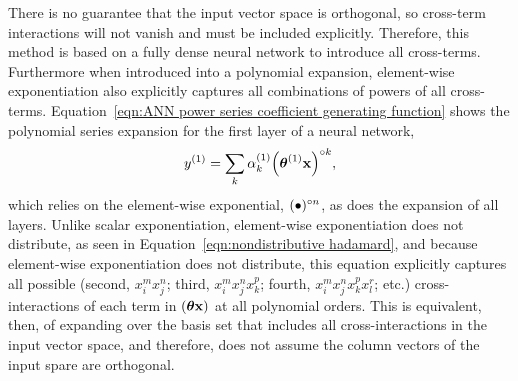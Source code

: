 %
%

There is no guarantee that the input vector space is orthogonal, so cross-term interactions will not vanish and must be included explicitly. Therefore, this method is based on a fully dense neural network to introduce all cross-terms. Furthermore when introduced into a polynomial expansion, element-wise exponentiation also explicitly captures all combinations of powers of all cross-terms. Equation~\ref{eqn:ANN power series coefficient generating function} shows the polynomial series expansion for the first layer of a neural network,
\[
    y^{(1)} = \sum_k \alpha^{(1)}_k \he[\left( \boldsymbol{\theta}^{(1)} {\bf x} \right)]{k},
\]
which relies on the element-wise exponential, $(\bullet)\he{n}$, as does the expansion of all layers. Unlike scalar exponentiation, element-wise exponentiation does not distribute, as seen in Equation~\ref{eqn:nondistributive hadamard}, and because element-wise exponentiation does not distribute, this equation explicitly captures all possible (second, $x_i^m x_j^n$; third, $x_i^m x_j^n x_k^p$; fourth, $x_i^m x_j^n x_k^p x_l^r$; etc.) cross-interactions of each term in $(\boldsymbol{\theta}{\bf x})$ at all polynomial orders. This is equivalent, then, of expanding over the basis set that includes all cross-interactions in the input vector space, and therefore, does not assume the column vectors of the input spare are orthogonal.

